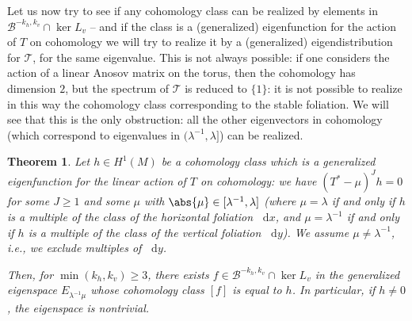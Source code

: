 \documentclass[11pt, a4paper, oneside, final, pagebackref]{amsart}
\newcommand{\boB}{\mathcal{B}}
\newcommand{\boT}{\mathcal{T}}
\newcommand{\dd}{\mathop{}\!\mathrm{d}}
\renewcommand{\geq}{\geqslant}
\newtheorem{thm}{Theorem}[section]
\theoremstyle{definition}
\numberwithin{equation}{section}
\begin{document}
Let us now try to see if any cohomology class can be realized by elements in
$\boB^{-k_h, k_v} \cap \ker L_v$ -- and if the class is a (generalized)
eigenfunction for the action of $T$ on cohomology we will try to realize it
by a (generalized) eigendistribution for $\boT$, for the same eigenvalue.
This is not always possible: if one considers the action of a linear Anosov
matrix on the torus, then the cohomology has dimension $2$, but the spectrum
of $\boT$ is reduced to $\{1\}$: it is not possible to realize in this way
the cohomology class corresponding to the stable foliation. We will see that
this is the only obstruction: all the other eigenvectors in cohomology (which
correspond to eigenvalues in $(\lambda^{-1}, \lambda]$) can be realized.

\begin{thm}
\label{thm:realise_H1} Let $h \in H^1(M)$ be a cohomology class which is a
generalized eigenfunction for the linear action of $T$ on cohomology: we have
$(T^* - \mu)^J h = 0$ for some $J\geq 1$ and some $\mu$ with $\abs{\mu}\in
[\lambda^{-1}, \lambda]$ (where $\mu = \lambda$ if and only if $h$ is a
multiple of the class of the horizontal foliation $\dd x$, and $\mu =
\lambda^{-1}$ if and only if $h$ is a multiple of the class of the vertical
foliation $\dd y$). We assume $\mu \neq \lambda^{-1}$, i.e., we exclude
multiples of $\dd y$.

Then, for $\min(k_h, k_v) \geq 3$, there exists $f \in \boB^{-k_h, k_v} \cap
\ker L_v$ in the generalized eigenspace $E_{\lambda^{-1} \mu}$ whose
cohomology class $[f]$ is equal to $h$. In particular, if $h \neq 0$, the
eigenspace is nontrivial.
\end{thm}
\end{document}
